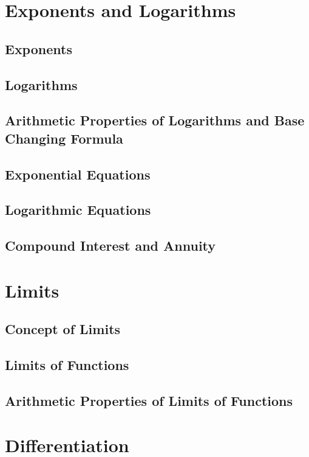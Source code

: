 \documentclass[12pt]{report}
\begin{document}
\chapter{Exponents and Logarithms}

\section{Exponents}

\section{Logarithms}

\section{Arithmetic Properties of Logarithms and Base Changing Formula}

\section{Exponential Equations}

\section{Logarithmic Equations}

\section{Compound Interest and Annuity}

\chapter{Limits}

\section{Concept of Limits}

\section{Limits of Functions}

\section{Arithmetic Properties of Limits of Functions}

\chapter{Differentiation}
\end{document}
